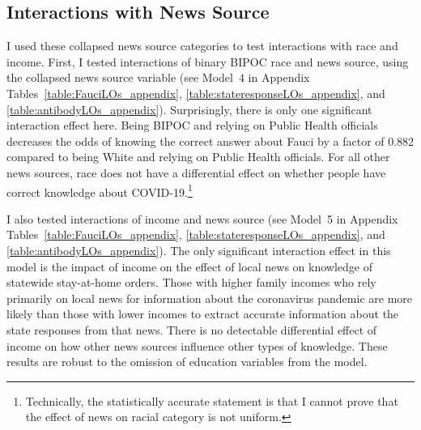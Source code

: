 \documentclass[11pt]{article}
\begin{document}
\subsection{Interactions with News Source}\label{sec:race-news}

I used these collapsed news source categories to test interactions with race and income. First, I tested interactions of binary BIPOC race and news source, using the collapsed news source variable (see Model~4 in Appendix Tables~\ref{table:FauciLOs_appendix}, \ref{table:stateresponseLOs_appendix}, and \ref{table:antibodyLOs_appendix}). Surprisingly, there is only one significant interaction effect here. Being BIPOC and relying on Public Health officials decreases the odds of knowing the correct answer about Fauci by a factor of 0.882 %
compared to being White and relying on Public Health officials. For all other news sources, race does not have a differential effect on whether people have correct knowledge about COVID-19.\footnote
    {Technically, the statistically accurate statement is that I cannot prove that the effect of news on racial category is not uniform.}




I also tested interactions of income and news source (see Model~5 in Appendix Tables~\ref{table:FauciLOs_appendix}, \ref{table:stateresponseLOs_appendix}, and \ref{table:antibodyLOs_appendix}). The only significant interaction effect in this model is the impact of income on the effect of local news on knowledge of statewide stay-at-home orders. Those with higher family incomes who rely primarily on local news for information about the coronavirus pandemic are more likely than those with lower incomes to extract accurate information about the state responses from that news. There is no detectable differential effect of income on how other news sources influence other types of knowledge. These results are robust to the omission of education variables from the model. 
\end{document}
